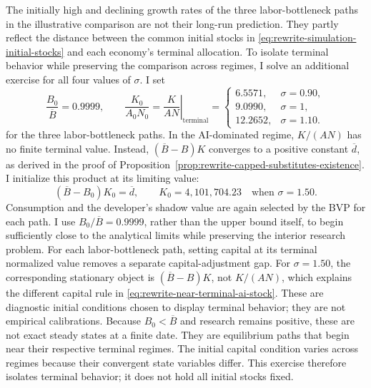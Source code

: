 The initially high and declining growth rates of the three labor-bottleneck
paths in the illustrative comparison are not their long-run prediction. They partly
reflect the distance between the common initial stocks in
\eqref{eq:rewrite-simulation-initial-stocks} and each economy's terminal
allocation. To isolate terminal behavior while preserving the comparison
across regimes, I solve an additional exercise for all four values of
$\sigma$. I set
\begin{equation}
 \frac{B_0}{\overline B}=0.9999,
 \qquad
 \frac{K_0}{A_0N_0}=
 \left.\frac{K}{AN}\right|_{\text{terminal}}
 =\begin{cases}
  6.5571,&\sigma=0.90,\\
  9.0990,&\sigma=1,\\
  12.2652,&\sigma=1.10.
 \end{cases}
 \label{eq:rewrite-near-terminal-stocks}
\end{equation}
for the three labor-bottleneck paths. In the AI-dominated regime,
$K/(AN)$ has no finite terminal value. Instead, $(\overline B-B)K$
converges to a positive constant $\overline d$, as derived in the proof of
Proposition~\ref{prop:rewrite-capped-substitutes-existence}.
I initialize this product at its limiting value:
\begin{equation}
 (\overline B-B_0)K_0=\overline d,
 \qquad K_0=4{,}101{,}704.23
 \quad\text{when }\sigma=1.50.
 \label{eq:rewrite-near-terminal-ai-stock}
\end{equation}
Consumption and the developer's shadow value are again selected by the BVP
for each path. I use $B_0/\overline B=0.9999$, rather than the upper bound itself,
to begin sufficiently close to the analytical limits while preserving the
interior research problem. For each labor-bottleneck path, setting capital at
its terminal normalized value removes a separate capital-adjustment gap. For
$\sigma=1.50$, the corresponding stationary object is
$(\overline B-B)K$, not $K/(AN)$, which explains the different capital rule in
\eqref{eq:rewrite-near-terminal-ai-stock}. These are diagnostic initial
conditions chosen to display terminal behavior; they are not empirical
calibrations. Because $B_0<\overline B$ and research remains positive, these
are not exact steady states at a finite date. They are equilibrium paths that
begin near their respective terminal regimes. The initial capital condition
varies across regimes because their convergent state variables differ. This
exercise therefore isolates terminal behavior; it does not hold all initial
stocks fixed.


